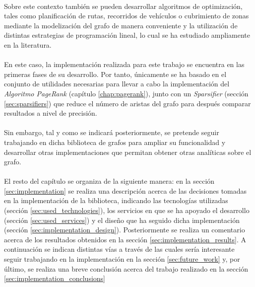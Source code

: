 \documentclass{subfiles}
\begin{document}
      \paragraph{}
      Sobre este contexto también se pueden desarrollar algoritmos de optimización, tales como planificación de rutas, recorridos de vehículos o cubrimiento de zonas mediante la modelización del grafo de manera conveniente y la utilización de distintas estrategias de programación lineal, lo cual se ha estudiado ampliamente en la literatura.

      \paragraph{}
      En este caso, la implementación realizada para este trabajo se encuentra en las primeras fases de su desarrollo. Por tanto, únicamente se ha basado en el conjunto de utilidades necesarias para llevar a cabo la implementación del \emph{Algoritmo PageRank} (capítulo \ref{chap:pagerank}), junto con un \emph{Sparsifier} (sección \ref{sec:sparsifiers}) que reduce el número de aristas del grafo para después comparar resultados a nivel de precisión.

      \paragraph{}
      Sin embargo, tal y como se indicará posteriormente, se pretende seguir trabajando en dicha biblioteca de grafos para ampliar su funcionalidad y desarrollar otras implementaciones que permitan obtener otras analíticas sobre el grafo.

      \paragraph{}
      El resto del capítulo se organiza de la siguiente manera: en la sección \ref{sec:implementation} se realiza una descripción acerca de las decisiones tomadas en la implementación de la biblioteca, indicando las tecnologías utilizadas (sección \ref{sec:used_technologies}), los servicios en que se ha apoyado el desarrollo (sección \ref{sec:used_services}) y el diseño que ha seguido dicha implementación (sección \ref{sec:implementation_design}). Posteriormente se realiza un comentario acerca de los resultados obtenidos en la sección \ref{sec:implementation_results}. A continuación se indican distintas vías a través de las cuales sería interesante seguir trabajando en la implementación en la sección \ref{sec:future_work} y, por último, se realiza una breve conclusión acerca del trabajo realizado en la sección \ref{sec:implementation_conclusions}
\end{document}
